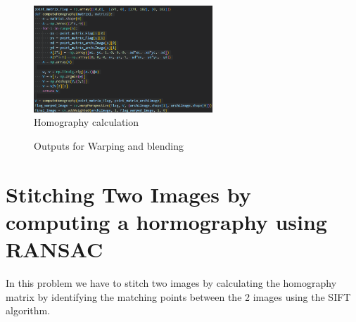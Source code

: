 \documentclass[10.5pt]{article}
\begin{document}
\begin{flushleft}
\begin{figure}[htp]
    \centering
    \includegraphics[width=0.6\textwidth]{Question2code3.png}
    \caption{Homography calculation}
\end{figure}

\begin{figure}
    \centering
    \qquad
    \qquad
    \caption{Outputs for Warping and blending}
    \label{fig:example2}
\end{figure}

\section{Stitching Two Images by computing a hormography using RANSAC }
In this problem we have to stitch two images by calculating the homography matrix by identifying the matching points between the 2 images using the SIFT algorithm.

\end{flushleft}
\end{document}
